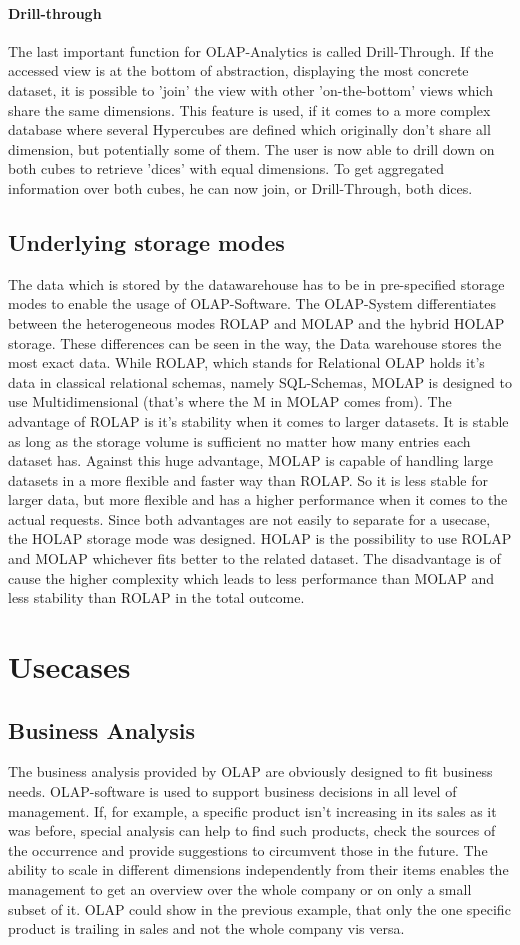 \documentclass[12pt,a4paper,oneside, 
liststotoc, 					%
bibtotoc,						%
titlepage, 						%
headsepline, 					%
BCOR6mm,						%
openany,							%
]{scrreprt}
\begin{document}
\subsubsection{Drill-through}\label{drill}
The last important function for OLAP-Analytics is called Drill-Through. If the accessed view is at the bottom of abstraction, displaying the most concrete dataset, it is possible to 'join' the view with other 'on-the-bottom' views which share the same dimensions. This feature is used, if it comes to a more complex database where several Hypercubes are defined which originally don't share all dimension, but potentially some of them. The user is now able to drill down on both cubes to retrieve 'dices' with equal dimensions. To get aggregated information over both cubes, he can now join, or Drill-Through, both dices.
\section{Underlying storage modes}
The data which is stored by the datawarehouse has to be in pre-specified storage modes to enable the usage of OLAP-Software. The OLAP-System differentiates between the heterogeneous modes ROLAP and MOLAP and the hybrid HOLAP storage. These differences can be seen in the way, the Data warehouse stores the most exact data. While ROLAP, which stands for Relational OLAP holds it's data in classical relational schemas, namely SQL-Schemas, MOLAP is designed to use Multidimensional (that's where the M in MOLAP comes from). The advantage of ROLAP is it's stability when it comes to larger datasets. It is stable as long as the storage volume is sufficient no matter how many entries each dataset has. Against this huge advantage, MOLAP is capable of handling large datasets in a more flexible and faster way than ROLAP. So it is less stable for larger data, but more flexible and has a higher performance when it comes to the actual requests.
Since both advantages are not easily to separate for a usecase, the HOLAP storage mode was designed. HOLAP is the possibility to use ROLAP and MOLAP whichever fits better to the related dataset. The disadvantage is of cause the higher complexity which leads to less performance than MOLAP and less stability than ROLAP in the total outcome.
\chapter{Usecases}\label{usecases}
\section{Business Analysis}\label{ba}
The business analysis provided by OLAP are obviously designed to fit business needs. OLAP-software is used to support business decisions in all level of management. If, for example, a specific product isn't increasing in its sales as it was before, special analysis can help to find such products, check the sources of the occurrence and provide suggestions to circumvent those in the future. The ability to scale in different dimensions independently from their items enables the management to get an overview over the whole company or on only a small subset of it. OLAP could show in the previous example, that only the one specific product is trailing in sales and not the whole company vis versa. 
\end{document}
